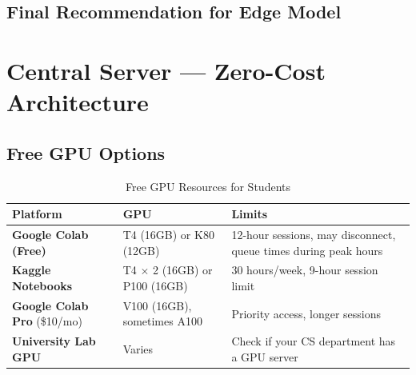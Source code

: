 \documentclass[11pt,a4paper]{article}
\begin{document}
\subsection{Final Recommendation for Edge Model}

\begin{center}
\end{center}

\section{Central Server — Zero-Cost Architecture}

\subsection{Free GPU Options}

\begin{table}[h]
\centering
\caption{Free GPU Resources for Students}
\begin{tabular}{@{}p{3cm}p{4cm}p{5cm}@{}}
\toprule
\textbf{Platform} & \textbf{GPU} & \textbf{Limits} \\
\midrule
\textbf{Google Colab (Free)} & T4 (16GB) or K80 (12GB) & 12-hour sessions, may disconnect, queue times during peak hours \\
\textbf{Kaggle Notebooks} & T4 $\times$ 2 (16GB) or P100 (16GB) & 30 hours/week, 9-hour session limit \\
\textbf{Google Colab Pro} (\$10/mo) & V100 (16GB), sometimes A100 & Priority access, longer sessions \\
\textbf{University Lab GPU} & Varies & Check if your CS department has a GPU server \\
\bottomrule
\end{tabular}
\end{table}
\end{document}
